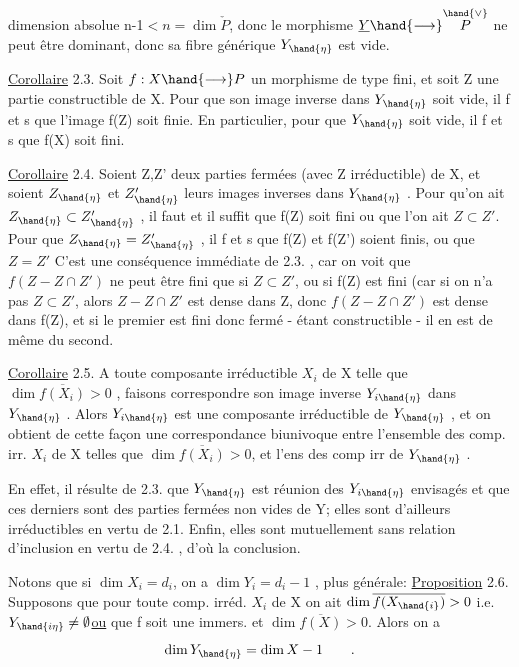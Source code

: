 
dimension absolue n-1$< n = \dim \check{P}$, donc le morphisme $\underline{Y}\hand{\longrightarrow} \overset{\hand{\vee}}{P}$ ne peut être dominant,
donc sa fibre générique $Y_{\hand{\eta}}$ est vide.

\uline{Corollaire} 2.3. Soit $f:X\hand{\longrightarrow} P$ un morphisme de type fini, et soit Z une
partie constructible de X. Pour que son image inverse dans $Y_{\hand{\eta}}$ soit vide,
il f et s que l'image f(Z) soit finie. En particulier, pour que  $Y_{\hand{\eta}}$ soit
vide, il f et s que f(X) soit fini.

\uline{Corollaire} 2.4. Soient Z,Z' deux parties fermées (avec Z irréductible) de X,
et soient $Z_{\hand{\eta}}$ et $Z'_{\hand{\eta}}$ leurs images inverses dans $Y_{\hand{\eta}}$ . Pour qu'on ait
$Z_{\hand{\eta}}\subset Z'_{\hand{\eta}}$ , il faut et il suffit que f(Z) soit fini ou que l'on ait $Z\subset Z'$.
Pour que $Z_{\hand{\eta}} = Z'_{\hand{\eta}}$ , il f et s que  f(Z) et f(Z') soient finis, ou que $Z=Z'$
 C'est une conséquence 
 immédiate de 2.3. , car on voit que $f(Z - Z\cap Z')$ ne peut être fini
que si $Z\subset Z'$, ou si f(Z) est fini (car si on n'a pas $Z\subset Z'$, alors $Z-Z\cap Z'$
est dense dans Z, donc $f(Z-Z\cap Z')$ est dense dans f(Z), et si le premier
est fini donc fermé - étant constructible - il en est de même du second.

\uline{Corollaire} 2.5. A toute composante irréductible $X_i$ de X telle que
$\dim \overline{f(X_i)} > 0$ , faisons correspondre  son image inverse $Y_{i\hand{\eta}}$ dans
$Y_{\hand{\eta}}$ . Alors $Y_{i\hand{\eta}}$ est une composante irréductible de $Y_{\hand{\eta}}$ , et on obtient de
cette façon une correspondance biunivoque entre l'ensemble des comp. irr.
$X_i$ de X telles que $\dim \overline{f(X_i)}> 0$, et l'ens des comp irr de $Y_{\hand{\eta}}$ .

En effet, il résulte de 2.3. que  $Y_{\hand{\eta}}$ est réunion des $Y_{i\hand{\eta}}$ envisagés
et que ces derniers sont des parties fermées non vides de Y; elles sont
d'ailleurs irréductibles en vertu de 2.1. Enfin, elles sont mutuellement
sans relation d'inclusion en vertu de 2.4. , d'où la conclusion.

Notons que si  $\dim X_i$$= d_i$,  on a $\dim Y_i = d_i-1$ ,  plus générale:
\uline{Proposition} 2.6. Supposons que pour toute comp. irréd. $X_i$ de X on ait $\dim \overline{f(X_{\hand{i}})} > 0$ i.e. $Y_{\hand{i\eta}} \neq \emptyset$\uline{ou} que f soit une immers. et $\dim \overline{f(X)}>0$. Alors on a
\[ \dim Y_{\hand{\eta}} = \dim X - 1 \qquad . \]

